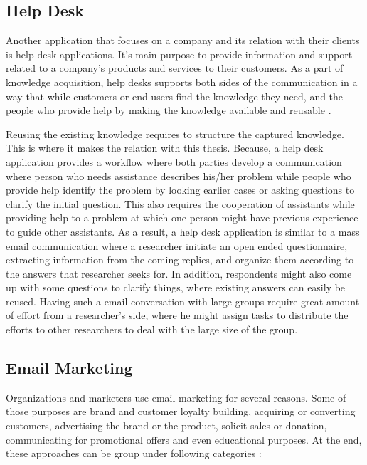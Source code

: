 \subsection{Help Desk}
\label{subsec:3.1.2:HelpDeskSoft}
Another application that focuses on a company and its relation with their clients is help desk applications. It's main purpose to provide information and support related to a company's products and services to their customers. As a part of knowledge acquisition, help desks supports both sides of the communication in a way that while customers or end users find the knowledge they need, and the people who provide help by making the knowledge available and reusable \citep{Halverson2004}.
\vspace{1cm}

Reusing the existing knowledge requires to structure the captured knowledge. This is where it makes the relation with this thesis. Because, a help desk application provides a workflow where both parties develop a communication where person who needs assistance describes his/her problem while people who provide help identify the problem by looking earlier cases or asking questions to clarify the initial question. This also requires the cooperation of assistants while providing help to a problem at which one person might have previous experience to guide other assistants. As a result, a help desk application is similar to a mass email communication where a researcher initiate an open ended questionnaire, extracting information from the coming replies, and organize them according to the answers that researcher seeks for. In addition, respondents might also come up with some questions to clarify things, where existing answers can easily be reused. Having such a email conversation with large groups require great amount of effort from a researcher's side, where he might assign tasks to distribute the efforts to other researchers to deal with the large size of the group.


\subsection{Email Marketing}
\label{subsec:3.1.3:EmaiMarkt}
Organizations and marketers use email marketing for several reasons. Some of those purposes are brand and customer loyalty building, acquiring or converting customers, advertising the brand or the product, solicit sales or donation, communicating for promotional offers and even educational purposes. At the end, these approaches can be group under following categories \cite{Eley2009}:


